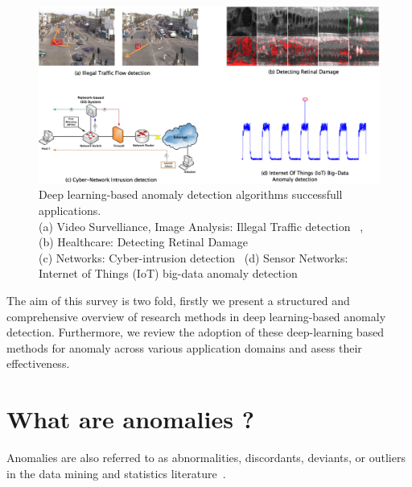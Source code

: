\begin{figure}[h]
\includegraphics[scale=0.5]{images/applications}
\captionsetup{justification=centering}
\caption{Deep learning-based anomaly detection algorithms successfull applications.\\
(a) Video Survelliance, Image Analysis: Illegal Traffic detection~\cite{xie2017real}  ,  (b) Healthcare: Detecting Retinal Damage~\cite{schlegl2017unsupervised}\\
(c) Networks: Cyber-intrusion detection~\cite{javaid2016deep}  (d) Sensor Networks: Internet of Things (IoT) big-data anomaly detection~\cite{mohammadi2017deep} }
\label{fig:applications}
\end{figure}

The aim of this survey is two fold, firstly we present a structured and comprehensive overview of research methods in deep learning-based anomaly detection. Furthermore, we review the adoption of these deep-learning based methods for anomaly across various application domains and asess their effectiveness.

\section{ What are anomalies ?}
Anomalies  are also referred to as abnormalities, discordants, deviants, or outliers in the data mining and statistics literature~\cite{aggarwal2013introduction}.

